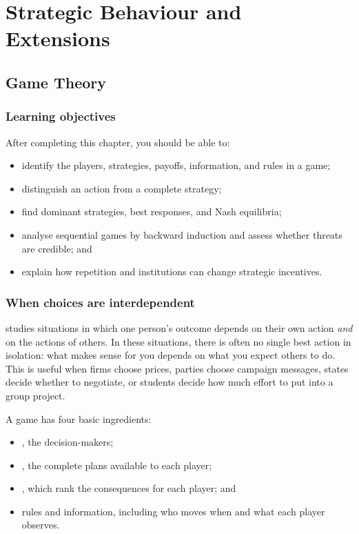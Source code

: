 \part{Strategic Behaviour and Extensions}

\chapter{Game Theory}
\label{chap:game-theory}

\section{Learning objectives}

After completing this chapter, you should be able to:
\begin{itemize}
  \item identify the players, strategies, payoffs, information, and rules in a game;
  \item distinguish an action from a complete strategy;
  \item find dominant strategies, best responses, and Nash equilibria;
  \item analyse sequential games by backward induction and assess whether threats are credible; and
  \item explain how repetition and institutions can change strategic incentives.
\end{itemize}

\section{When choices are interdependent}

 studies situations in which one person's outcome depends
on their own action \emph{and} on the actions of others. In these situations,
there is often no single best action in isolation: what makes sense for you depends
on what you expect others to do. This is useful when firms choose prices,
parties choose campaign messages, states decide whether to negotiate, or
students decide how much effort to put into a group project.

A game has four basic ingredients:
\begin{itemize}
  \item {}, the decision-makers;
  \item {}, the complete plans available to each player;
  \item {}, which rank the consequences for each player; and
  \item rules and information, including who moves when and what each player observes.
\end{itemize}

